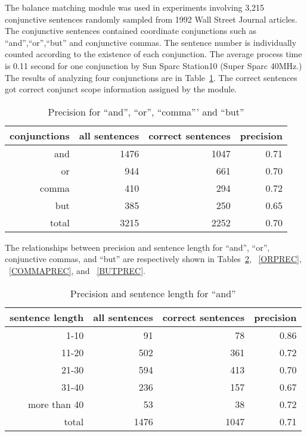 The balance matching module was used in experiments involving 3,215
conjunctive sentences randomly sampled from 1992 Wall Street Journal
articles. The conjunctive sentences contained coordinate conjunctions
such as ``and'',``or'',``but'' and conjunctive commas.
The sentence
number is individually counted according to the existence of each
conjunction.
The average process time is  0.11 second for
one conjunction by Sun Sparc Station10 (Super Sparc 40MHz.)
The results of analyzing four conjunctions are in Table~\ref{ALLPREC}.
The correct sentences got correct conjunct scope information assigned
by the module.

  \begin{table}
    \caption{Precision for ``and'', ``or'', ``comma''' and ``but''}
    \label{ALLPREC}
    \begin{center}
      \begin{tabular}{|r|r|r|r|}
        \hline
conjunctions & all sentences  & correct sentences & precision \\
        \hline
and & 1476 & 1047 & 0.71 \\
or & 944 & 661 & 0.70 \\
comma & 410 & 294 & 0.72 \\
but & 385 & 250 & 0.65 \\
        \hline
total & 3215 & 2252 & 0.70 \\
	\hline
      \end{tabular}
    \end{center}
  \end{table}

The relationships between precision and sentence length for ``and'',
``or'', conjunctive commas, and ``but'' are respectively shown in
Tables~\ref{ANDPREC}, ~\ref{ORPREC}, ~\ref{COMMAPREC}, and
~\ref{BUTPREC}.

  \begin{table}
    \caption{Precision and sentence length for ``and''}
    \label{ANDPREC}
    \begin{center}
      \begin{tabular}{|r|r|r|r|}
        \hline
sentence length & all sentences & correct sentences & precision\\
        \hline
1-10 & 91 & 78 & 0.86 \\
11-20 & 502 & 361 & 0.72 \\
21-30 & 594 & 413 & 0.70 \\
31-40 & 236 & 157 & 0.67 \\
more than 40 & 53 & 38 & 0.72 \\
	\hline
total & 1476 & 1047 & 0.71 \\
        \hline
      \end{tabular}
    \end{center}
  \end{table}

